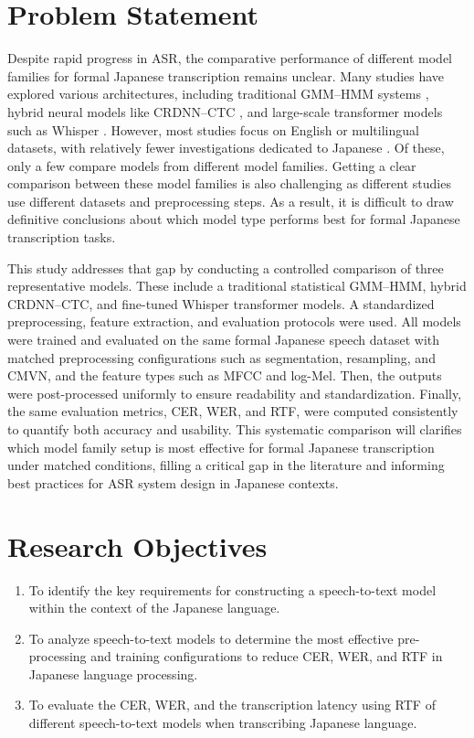 \section{Problem Statement}
Despite rapid progress in ASR, the comparative performance of different model families for formal Japanese transcription remains unclear. Many studies have explored various architectures, including traditional GMM--HMM systems \parencite{KaldiCSJResults2015}, hybrid neural models like CRDNN--CTC \parencite{chen2020streaming}, and large-scale transformer models such as Whisper \parencite{radford2023robust}. However, most studies focus on English or multilingual datasets, with relatively fewer investigations dedicated to Japanese \parencite{xu2023recent}. Of these, only a few compare models from different model families. Getting a clear comparison between these model families is also challenging as different studies use different datasets and preprocessing steps. As a result, it is difficult to draw definitive conclusions about which model type performs best for formal Japanese transcription tasks.

This study addresses that gap by conducting a controlled comparison of three representative models. These include a traditional statistical GMM--HMM, hybrid CRDNN--CTC, and fine-tuned Whisper transformer models. A standardized preprocessing, feature extraction, and evaluation protocols were used. All models were trained and evaluated on the same formal Japanese speech dataset with matched preprocessing configurations such as segmentation, resampling, and CMVN, and the feature types such as MFCC and log-Mel. Then, the outputs were post-processed uniformly to ensure readability and standardization. Finally, the same evaluation metrics, CER, WER, and RTF, were computed consistently to quantify both accuracy and usability. This systematic comparison will clarifies which model family setup is most effective for formal Japanese transcription under matched conditions, filling a critical gap in the literature and informing best practices for ASR system design in Japanese contexts.

\section{Research Objectives}
\begin{enumerate}
    \item To identify the key requirements for constructing a speech-to-text model within the context of the Japanese language.
    \item To analyze speech-to-text models to determine the most effective pre-processing and training configurations to reduce CER, WER, and RTF in Japanese language processing.
    \item To evaluate the CER, WER, and the transcription latency using RTF of different speech-to-text models when transcribing Japanese language.
\end{enumerate}

